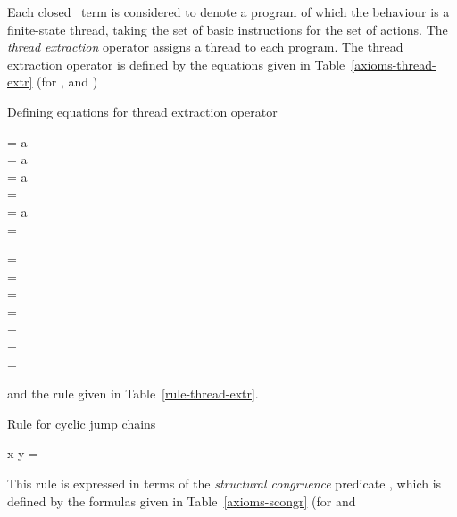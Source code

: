 \documentclass[fleqn]{llncs}
\begin{document}
Each closed \PGA\ term is considered to denote a program of which the
behaviour is a finite-state thread, taking the set  of basic
instructions for the set  of actions.
The \emph{thread extraction} operator  assigns a thread to
each program.
The thread extraction operator is defined by the equations given in
Table~\ref{axioms-thread-extr} (for ,  and
)\begin{table}[!t]
\caption{Defining equations for thread extraction operator}
\label{axioms-thread-extr}
\begin{eqntbl}
\begin{eqncol}
 = a \bapf \DeadEnd \\
 = a \bapf {} \\
 = a \bapf \DeadEnd \\
 =
 \\
 = a \bapf \DeadEnd \\
 =
\end{eqncol}
\qquad
\begin{eqncol}
 = \DeadEnd \\
 = \DeadEnd \\
 =  \\
 = \DeadEnd \\
 =  \\
\extr{\halt} = \Stop \\
 = \Stop
\end{eqncol}
\end{eqntbl}
\end{table}
and the rule given in Table~\ref{rule-thread-extr}.\begin{table}[!t]
\caption{Rule for cyclic jump chains}
\label{rule-thread-extr}
\begin{eqntbl}
\begin{eqncol}
x \scongr {} \conc y \Implies {} = \DeadEnd
\end{eqncol}
\end{eqntbl}
\end{table}
This rule is expressed in terms of the \emph{structural congruence}
predicate , which is defined by the formulas given in
Table~\ref{axioms-scongr} (for  and
\end{document}
